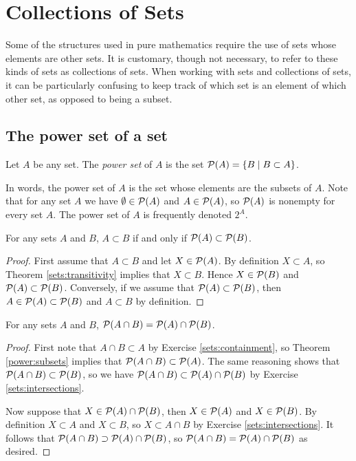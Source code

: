 \section{Collections of Sets}

Some of the structures used in pure mathematics require the use of sets whose elements are other sets.  It is customary, though not necessary, to refer to these kinds of sets as collections of sets.  When working with sets and collections of sets, it can be particularly confusing to keep track of which set is an element of which other set, as opposed to being a subset.

\subsection{The power set of a set}

\begin{definition}
Let $A$ be any set.  The \emph{power set} of $A$ is the set ${\cal P} (A)=\{ B\mid B\subset A\}$. 
\end{definition}

In words, the power set of $A$ is the set whose elements are the subsets of $A$.  Note that for any set $A$ we have $\emptyset\in{\cal P}(A)$ and $A\in{\cal P}(A)$, so ${\cal P}(A)$ is nonempty for every set $A$.  The power set of $A$ is frequently denoted $2^A$.

\begin{thrm}\label{power:subsets}
For any sets $A$ and $B$, $A\subset B$ if and only if ${\cal
P}(A)\subset {\cal P}(B)$.
\end{thrm}

\begin{proof}
First assume that $A\subset B$ and let $X\in{\cal P}(A)$.  By definition
$X\subset A$, so Theorem \ref{sets:transitivity} implies that $X\subset
B$.  Hence $X\in{\cal P}(B)$ and ${\cal P}(A)\subset{\cal P}(B)$.
Conversely, if we assume that ${\cal P}(A)\subset {\cal P}(B)$, then
$A\in{\cal P}(A)\subset{\cal P}(B)$ and $A\subset B$ by definition.
\end{proof}

\begin{thrm}\label{power:intersection}
For any sets $A$ and $B$, ${\cal P}(A\cap B)={\cal P}(A)\cap{\cal P}(B)$.
\end{thrm}

\begin{proof}
First note that $A\cap B\subset A$ by Exercise \ref{sets:containment},
so Theorem \ref{power:subsets} implies that ${\cal P}(A\cap B)\subset
{\cal P}(A)$.  The same reasoning shows that ${\cal P}(A\cap B)\subset
{\cal P}(B)$, so we have ${\cal P}(A\cap B)\subset{\cal P}(A)\cap {\cal
P}(B)$ by Exercise \ref{sets:intersections}.

Now suppose that $X\in{\cal P}(A)\cap {\cal P}(B)$, then $X\in{\cal
P}(A)$ and $X\in {\cal P}(B)$.  By definition $X\subset A$ and $X\subset
B$, so $X\subset A\cap B$ by Exercise \ref{sets:intersections}.  It
follows that ${\cal P}(A\cap B)\supset{\cal P}(A)\cap {\cal P}(B)$, so
${\cal P}(A\cap B)={\cal P}(A)\cap {\cal P}(B)$ as desired.
\end{proof}

